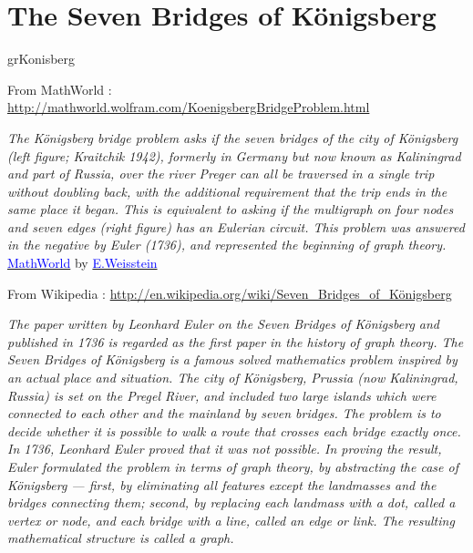 \newpage\section{The Seven Bridges of Königsberg}\label{seven}
\begin{NewMacroBox}{grKonisberg}{}

\medskip
From MathWorld : \url{http://mathworld.wolfram.com/KoenigsbergBridgeProblem.html}

\emph{The Königsberg bridge problem asks if the seven bridges of the city of Königsberg (left figure; Kraitchik 1942), formerly in Germany but now known as Kaliningrad and part of Russia, over the river Preger can all be traversed in a single trip without doubling back, with the additional requirement that the trip ends in the same place it began. This is equivalent to asking if the multigraph on four nodes and seven edges (right figure) has an Eulerian circuit. This problem was answered in the negative by Euler (1736), and represented the beginning of graph theory.}
\href{http://mathworld.wolfram.com/topics/GraphTheory.html}%
           {\textcolor{blue}{MathWorld}} by \href{http://en.wikipedia.org/wiki/Eric_W._Weisstein}%
           {\textcolor{blue}{E.Weisstein}} 

\medskip
From Wikipedia : \url{http://en.wikipedia.org/wiki/Seven_Bridges_of_Königsberg}

\emph{The paper written by Leonhard Euler on the Seven Bridges of Königsberg and published in 1736 is regarded as the first paper in the history of graph theory.\hfill\break
The Seven Bridges of Königsberg is a famous solved mathematics problem inspired by an actual place and situation. The city of Königsberg, Prussia (now Kaliningrad, Russia) is set on the Pregel River, and included two large islands which were connected to each other and the mainland by seven bridges. The problem is to decide whether it is possible to walk a route that crosses each bridge exactly once.\hfill\break
In 1736, Leonhard Euler proved that it was not possible. In proving the result, Euler formulated the problem in terms of graph theory, by abstracting the case of Königsberg — first, by eliminating all features except the landmasses and the bridges connecting them; second, by replacing each landmass with a dot, called a vertex or node, and each bridge with a line, called an edge or link. The resulting mathematical structure is called a graph.}
\end{NewMacroBox}

